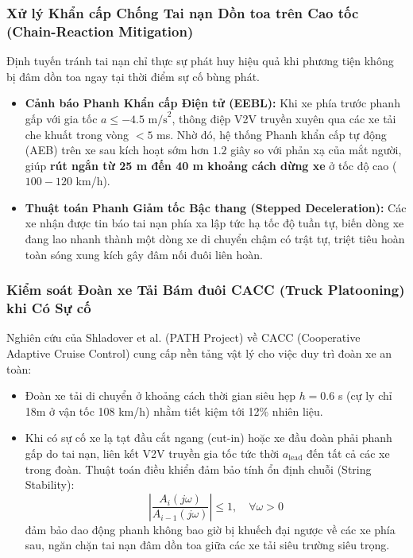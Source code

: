 \documentclass[a4paper]{article}
\begin{document}
\subsubsection{Xử lý Khẩn cấp Chống Tai nạn Dồn toa trên Cao tốc (Chain-Reaction Mitigation)}
Định tuyến tránh tai nạn chỉ thực sự phát huy hiệu quả khi phương tiện không bị đâm dồn toa ngay tại thời điểm sự cố bùng phát.
\begin{itemize}
    \item \textbf{Cảnh báo Phanh Khẩn cấp Điện tử (EEBL):} Khi xe phía trước phanh gấp với gia tốc $a \le -4.5 \text{ m/s}^2$, thông điệp V2V truyền xuyên qua các xe tải che khuất trong vòng $< 5$ ms. Nhờ đó, hệ thống Phanh khẩn cấp tự động (AEB) trên xe sau kích hoạt sớm hơn $1.2$ giây so với phản xạ của mắt người, giúp \textbf{rút ngắn từ 25 m đến 40 m khoảng cách dừng xe} ở tốc độ cao ($100 - 120$ km/h).
    \item \textbf{Thuật toán Phanh Giảm tốc Bậc thang (Stepped Deceleration):} Các xe nhận được tin báo tai nạn phía xa lập tức hạ tốc độ tuần tự, biến dòng xe đang lao nhanh thành một dòng xe di chuyển chậm có trật tự, triệt tiêu hoàn toàn sóng xung kích gây đâm nối đuôi liên hoàn.
\end{itemize}

\subsubsection{Kiểm soát Đoàn xe Tải Bám đuôi CACC (Truck Platooning) khi Có Sự cố}
Nghiên cứu của Shladover et al. (PATH Project) \cite{other_references} về CACC (Cooperative Adaptive Cruise Control) cung cấp nền tảng vật lý cho việc duy trì đoàn xe an toàn:
\begin{itemize}
    \item Đoàn xe tải di chuyển ở khoảng cách thời gian siêu hẹp $h = 0.6$ s (cự ly chỉ 18m ở vận tốc 108 km/h) nhằm tiết kiệm tới 12\% nhiên liệu.
    \item Khi có sự cố xe lạ tạt đầu cắt ngang (cut-in) hoặc xe đầu đoàn phải phanh gấp do tai nạn, liên kết V2V truyền gia tốc tức thời $a_{\text{lead}}$ đến tất cả các xe trong đoàn. Thuật toán điều khiển đảm bảo tính ổn định chuỗi (String Stability):
    \begin{equation}
        \left| \frac{A_i(j\omega)}{A_{i-1}(j\omega)} \right| \le 1, \quad \forall \omega > 0
    \end{equation}
    đảm bảo dao động phanh không bao giờ bị khuếch đại ngược về các xe phía sau, ngăn chặn tai nạn đâm dồn toa giữa các xe tải siêu trường siêu trọng.
\end{itemize}
\end{document}
